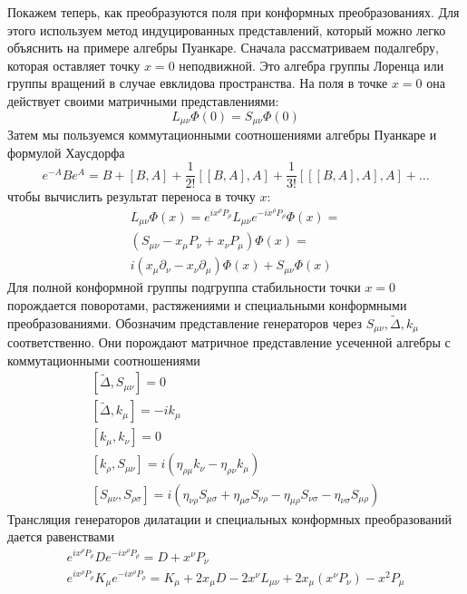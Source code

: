 \documentclass[a4paper,12pt]{article}
\theoremstyle{definition}
\theoremstyle{definition}
\theoremstyle{definition}
\begin{document}
Покажем теперь, как преобразуются поля при конформных преобразованиях. Для этого используем метод индуцированных представлений, который можно легко объяснить на примере алгебры Пуанкаре. Сначала рассматриваем подалгебру, которая оставляет точку $x=0$ неподвижной. Это алгебра группы Лоренца или группы вращений в случае евклидова пространства. На поля в точке $x=0$ она действует своими матричными представлениями:
\begin{equation}
  \label{eq:176}
  L_{\mu\nu}\Phi(0)=S_{\mu\nu}\Phi(0)
\end{equation}
Затем мы пользуемся коммутационными соотношениями алгебры Пуанкаре и формулой Хаусдорфа
\begin{equation}
  \label{eq:177}
  e^{-A}B e^{A}=B+[B,A]+\frac{1}{2!}[[B,A],A]+\frac{1}{3!}[[[B,A],A],A]+\dots
\end{equation}
чтобы вычислить результат переноса в точку $x$:
\begin{multline}
  \label{eq:178}
  L_{\mu\nu}\Phi(x)=e^{ix^{\rho}P_{\rho}}L_{\mu\nu}e^{-i x^{\rho}P_{\rho}}\Phi(x)=\\
  (S_{\mu\nu}-x_{\mu}P_{\nu}+x_{\nu}P_{\mu})\Phi(x)=\\
  i(x_{\mu}\partial_{\nu}-x_{\nu}\partial_{\mu})\Phi(x)+S_{\mu\nu}\Phi(x)
\end{multline}
Для полной конформной группы подгруппа стабильности точки $x=0$ порождается поворотами, растяжениями и специальными конформными преобразованиями. Обозначим представление генераторов через $S_{\mu\nu}, \tilde \Delta, k_{\mu}$ соответственно. Они порождают матричное представление усеченной алгебры с коммутационными соотношениями
\begin{eqnarray}
  \label{eq:179}
  \left[\tilde\Delta,S_{\mu\nu}\right]=0\\
  \left[\tilde \Delta,k_{\mu}\right]=-i k_{\mu}\\
  \left[k_{\mu},k_{\nu}\right]=0\\
  \left[k_{\rho},S_{\mu\nu}\right]=i(\eta_{\rho\mu}k_{\nu}-\eta_{\rho\nu}k_{\mu})\\
  \left[S_{\mu\nu},S_{\rho\sigma}\right]=i(\eta_{\nu\rho}S_{\mu\sigma}+\eta_{\mu\sigma}S_{\nu\rho}-\eta_{\mu\rho}S_{\nu\sigma}-\eta_{\nu\sigma}S_{\mu\rho})
\end{eqnarray}
Трансляция генераторов дилатации и специальных конформных преобразований дается равенствами
\begin{eqnarray}
  \label{eq:180}
  e^{i x^{\rho}P_{\rho}}D e^{-i x^{\rho}P_{\rho}}=D+x^{\nu}P_{\nu}\\
  e^{i x^{\rho}P_{\rho}}K_{\mu} e^{-i x^{\rho}P_{\rho}}=K_{\mu}+2x_{\mu}D -2 x^{\nu}L_{\mu\nu}+2x_{\mu}(x^{\nu}P_{\nu})-x^{2} P_{\mu}
\end{eqnarray}
\end{document}
